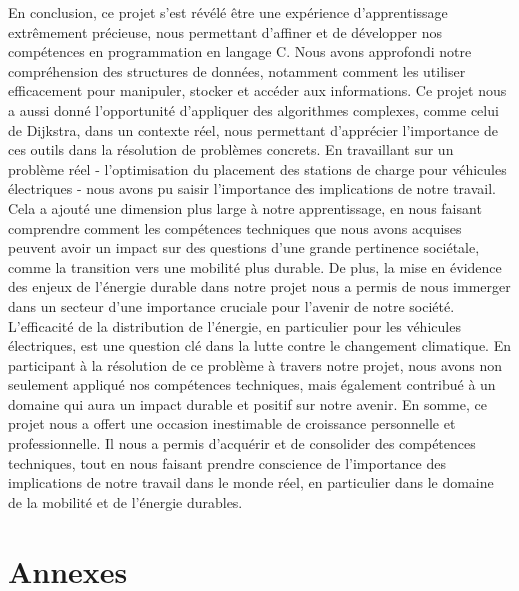 \documentclass[french,a4paper]{article}
\begin{document}
En conclusion, ce projet s'est révélé être une expérience d'apprentissage extrêmement précieuse, nous permettant d'affiner et de développer nos compétences en programmation en langage C. Nous avons approfondi notre compréhension des structures de données, notamment comment les utiliser efficacement pour manipuler, stocker et accéder aux informations. Ce projet nous a aussi donné l'opportunité d'appliquer des algorithmes complexes, comme celui de Dijkstra, dans un contexte réel, nous permettant d'apprécier l'importance de ces outils dans la résolution de problèmes concrets.
\newline
En travaillant sur un problème réel - l'optimisation du placement des stations de charge pour véhicules électriques - nous avons pu saisir l'importance des implications de notre travail. Cela a ajouté une dimension plus large à notre apprentissage, en nous faisant comprendre comment les compétences techniques que nous avons acquises peuvent avoir un impact sur des questions d'une grande pertinence sociétale, comme la transition vers une mobilité plus durable.
\newline
De plus, la mise en évidence des enjeux de l'énergie durable dans notre projet nous a permis de nous immerger dans un secteur d'une importance cruciale pour l'avenir de notre société. L'efficacité de la distribution de l'énergie, en particulier pour les véhicules électriques, est une question clé dans la lutte contre le changement climatique. En participant à la résolution de ce problème à travers notre projet, nous avons non seulement appliqué nos compétences techniques, mais également contribué à un domaine qui aura un impact durable et positif sur notre avenir.
\newline
En somme, ce projet nous a offert une occasion inestimable de croissance personnelle et professionnelle. Il nous a permis d'acquérir et de consolider des compétences techniques, tout en nous faisant prendre conscience de l'importance des implications de notre travail dans le monde réel, en particulier dans le domaine de la mobilité et de l'énergie durables.

\section{Annexes}





\end{document}

